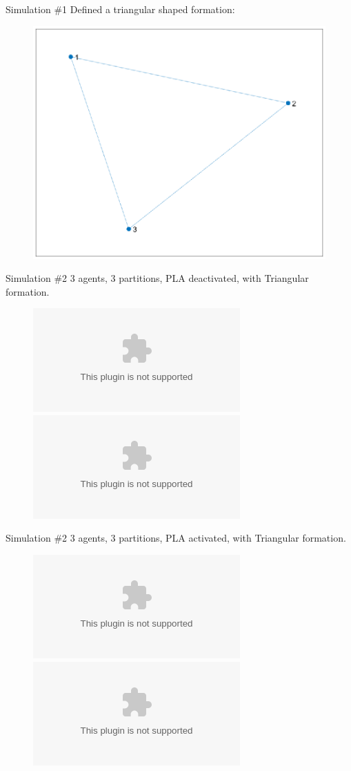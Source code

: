 \documentclass[t]{beamer}
\begin{document}
\subsection[Simulations]{}
\begin{frame}[label=formsim1]{Simulation \#1}
Defined a triangular shaped formation:
\begin{figure}
\centering
\includegraphics[scale=0.6]{sim/sim-formationshape.eps}
\end{figure}
\end{frame}
\begin{frame}[label=plasim2]{Simulation \#2}
3 agents, 3 partitions, PLA deactivated, with Triangular formation.
\begin{figure}
\centering
\includegraphics<1>[scale=0.6]{sim/sim1-3agents-3partitions-noPLA.eps}
\includegraphics<2>[scale=0.6]{sim/sim3-3agents-3partitions-noPLA-formation.eps}
\end{figure}
\end{frame}
\begin{frame}[label=plasim3]{Simulation \#2}
3 agents, 3 partitions, PLA activated, with Triangular formation.
\begin{figure}
\centering
\includegraphics<1>[scale=0.6]{sim/sim2-3agents-3partitions-PLA.eps}
\includegraphics<2>[scale=0.6]{sim/sim4-3agents-3partitions-PLA-formation.eps}
\end{figure}
\end{frame}

\end{document}
